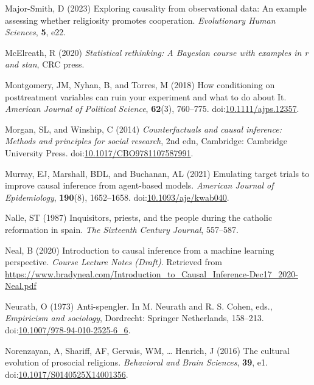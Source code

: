 \documentclass[
  single column]{article}
\newlength{\cslhangindent}
\newenvironment{CSLReferences}[2] %
 {\begin{list}{}{%
  \setlength{\itemindent}{0pt}
  \setlength{\leftmargin}{0pt}
  \setlength{\parsep}{0pt}
  \ifodd #1
   \setlength{\leftmargin}{\cslhangindent}
   \setlength{\itemindent}{-1\cslhangindent}
  \fi
  \setlength{\itemsep}{#2\baselineskip}}}
 {\end{list}}
\begin{document}
\begin{CSLReferences}{1}{0}
Major-Smith, D (2023) Exploring causality from observational data: An
example assessing whether religiosity promotes cooperation.
\emph{Evolutionary Human Sciences}, \textbf{5}, e22.

McElreath, R (2020) \emph{Statistical rethinking: A {B}ayesian course
with examples in r and stan}, CRC press.

Montgomery, JM, Nyhan, B, and Torres, M (2018) How conditioning on
posttreatment variables can ruin your experiment and what to do about
It. \emph{American Journal of Political Science}, \textbf{62}(3),
760--775.
doi:\href{https://doi.org/10.1111/ajps.12357}{10.1111/ajps.12357}.

Morgan, SL, and Winship, C (2014) \emph{Counterfactuals and causal
inference: Methods and principles for social research}, 2nd edn,
Cambridge: Cambridge University Press.
doi:\href{https://doi.org/10.1017/CBO9781107587991}{10.1017/CBO9781107587991}.

Murray, EJ, Marshall, BDL, and Buchanan, AL (2021) Emulating target
trials to improve causal inference from agent-based models.
\emph{American Journal of Epidemiology}, \textbf{190}(8), 1652--1658.
doi:\href{https://doi.org/10.1093/aje/kwab040}{10.1093/aje/kwab040}.

Nalle, ST (1987) Inquisitors, priests, and the people during the
catholic reformation in spain. \emph{The Sixteenth Century Journal},
557--587.

Neal, B (2020) Introduction to causal inference from a machine learning
perspective. \emph{Course Lecture Notes (Draft)}. Retrieved from
\url{https://www.bradyneal.com/Introduction_to_Causal_Inference-Dec17_2020-Neal.pdf}

Neurath, O (1973) Anti-spengler. In M. Neurath and R. S. Cohen, eds.,
\emph{Empiricism and sociology}, Dordrecht: Springer Netherlands,
158--213.
doi:\href{https://doi.org/10.1007/978-94-010-2525-6_6}{10.1007/978-94-010-2525-6\_6}.

Norenzayan, A, Shariff, AF, Gervais, WM, \ldots{} Henrich, J (2016) The
cultural evolution of prosocial religions. \emph{Behavioral and Brain
Sciences}, \textbf{39}, e1.
doi:\href{https://doi.org/10.1017/S0140525X14001356}{10.1017/S0140525X14001356}.


\end{CSLReferences}
\end{document}
